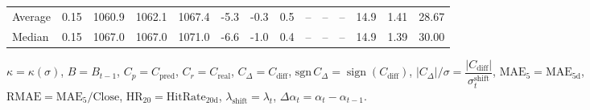 \begin{threeparttable}
{\begin{tabular}{lrrrrrrrrrrrrr}
Average &     0.15 & 1060.9 & 1062.1 & 1067.4 &       -5.3 &                     -0.3 &                 0.5 &         -- &        -- &             -- &             14.9 &            1.41 &                  28.67 \\
 Median &     0.15 & 1067.0 & 1067.0 & 1071.0 &       -6.6 &                     -1.0 &                 0.4 &         -- &        -- &             -- &             14.9 &            1.39 &                  30.00 \\
\bottomrule
\end{tabular}
}
\begin{tablenotes}\footnotesize
\item $\kappa=\kappa(\sigma)$, $B=B_{t-1}$, $C_p=C_{\text{pred}}$, $C_r=C_{\text{real}}$, $C_\Delta=C_{\text{diff}}$, $\mathrm{sgn}\,C_\Delta=\operatorname{sign}(C_{\text{diff}})$, $|C_\Delta|/\sigma=\dfrac{|C_{\text{diff}}|}{\sigma_t^{\text{shift}}}$, $\mathrm{MAE}_5=\mathrm{MAE}_{5\text{d}}$, $\mathrm{RMAE}= \mathrm{MAE}_5 / \text{Close}$, $\mathrm{HR}_{20}=\mathrm{HitRate}_{20\text{d}}$, 
$\lambda_{\text{shift}}=\lambda_t$, 
$\Delta\alpha_t=\alpha_t-\alpha_{t-1}$.
\end{tablenotes}
\end{threeparttable}
\endgroup

